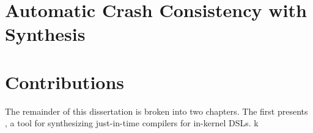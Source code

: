\section{Automatic Crash Consistency with Synthesis}

\section{Contributions}
The remainder of this dissertation is broken into two chapters.
The first presents \jitsynth, a tool for synthesizing just-in-time compilers for
in-kernel DSLs.
k
